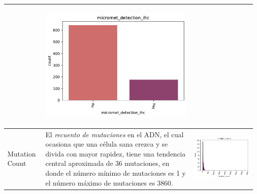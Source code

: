 \begin{table}[!htb]
\begin{threeparttable}
\begin{tabular}{p{2.5cm} p{7.5cm} p{6.5cm}}
			& \begin{center}\includegraphics[width=1\linewidth]{NOTEBOOK/IMAGENES_DESCRIPTIVAS/28_micromet_detection_ihc}\end{center}
			\\ \hline
			
			Mutation Count
			& El \textit{recuento de mutaciones} en el ADN, el cual ocasiona que una célula sana  crezca y se divida con mayor rapidez, tiene  una tendencia central aproximada de 36 mutaciones, en donde el número mínimo de mutaciones es 1 y el número máximo de mutaciones es 3860.
			& \begin{center}\includegraphics[width=1\linewidth]{NOTEBOOK/IMAGENES_DESCRIPTIVAS/29_mutation_count}\end{center}
			\\ \hline
		\end{tabular}
	\end{threeparttable}
\end{table}


